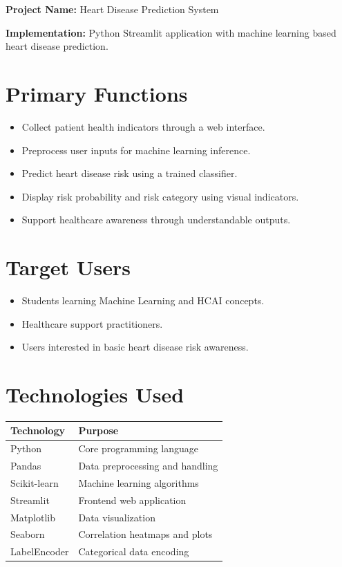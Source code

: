 \documentclass[12pt]{article}
\begin{document}
\textbf{Project Name:} Heart Disease Prediction System

\textbf{Implementation:}
Python Streamlit application with machine learning based heart disease prediction.

\section*{Primary Functions}

\begin{itemize}
    \item Collect patient health indicators through a web interface.
    \item Preprocess user inputs for machine learning inference.
    \item Predict heart disease risk using a trained classifier.
    \item Display risk probability and risk category using visual indicators.
    \item Support healthcare awareness through understandable outputs.
\end{itemize}

\section*{Target Users}

\begin{itemize}
    \item Students learning Machine Learning and HCAI concepts.
    \item Healthcare support practitioners.
    \item Users interested in basic heart disease risk awareness.
\end{itemize}

\section*{Technologies Used}

\begin{table}[h]
\centering
\begin{tabular}{ll}
\toprule
\textbf{Technology} & \textbf{Purpose} \\
\midrule
Python & Core programming language \\
Pandas & Data preprocessing and handling \\
Scikit-learn & Machine learning algorithms \\
Streamlit & Frontend web application \\
Matplotlib & Data visualization \\
Seaborn & Correlation heatmaps and plots \\
LabelEncoder & Categorical data encoding \\
\bottomrule
\end{tabular}
\end{table}
\end{document}
